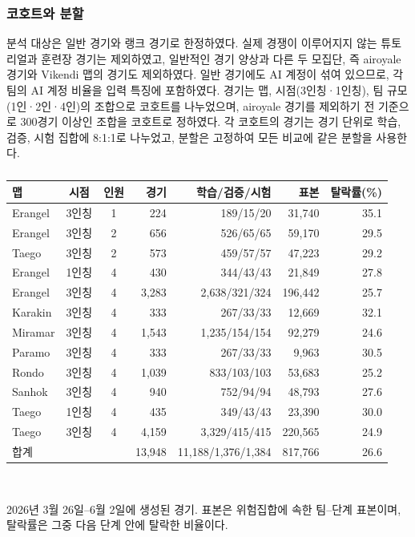 \subsubsection{코호트와 분할}
\label{sec:method:cohort}
분석 대상은 일반 경기와 랭크 경기로 한정하였다.
실제 경쟁이 이루어지지 않는 튜토리얼과 훈련장 경기는 제외하였고, 일반적인 경기 양상과 다른 두 모집단, 즉  airoyale 경기와  Vikendi 맵의 경기도 제외하였다.
일반 경기에도 AI 계정이 섞여 있으므로, 각 팀의 AI 계정 비율을 입력 특징에 포함하였다.
경기는 맵, 시점(3인칭·1인칭), 팀 규모(1인·2인·4인)의 조합으로 코호트를 나누었으며, airoyale 경기를 제외하기 전 기준으로 300경기 이상인 조합을 코호트로 정하였다.
각 코호트의 경기는 경기 단위로 학습, 검증, 시험 집합에 8:1:1로 나누었고, 분할은 고정하여 모든 비교에 같은 분할을 사용한다.

\begin{table}[t]
\centering
\caption{}
\label{tab:cohorts}
\footnotesize
\setlength{\tabcolsep}{3pt}
\begin{tabular}{lccrrrr}
\hline
맵 & 시점 & 인원 & 경기 & 학습/검증/시험 & 표본 & 탈락률(\%) \\
\hline
Erangel & 3인칭 & 1 & 224 & 189/15/20 & 31,740 & 35.1 \\
Erangel & 3인칭 & 2 & 656 & 526/65/65 & 59,170 & 29.5 \\
Taego & 3인칭 & 2 & 573 & 459/57/57 & 47,223 & 29.2 \\
Erangel & 1인칭 & 4 & 430 & 344/43/43 & 21,849 & 27.8 \\
Erangel & 3인칭 & 4 & 3,283 & 2,638/321/324 & 196,442 & 25.7 \\
Karakin & 3인칭 & 4 & 333 & 267/33/33 & 12,669 & 32.1 \\
Miramar & 3인칭 & 4 & 1,543 & 1,235/154/154 & 92,279 & 24.6 \\
Paramo & 3인칭 & 4 & 333 & 267/33/33 & 9,963 & 30.5 \\
Rondo & 3인칭 & 4 & 1,039 & 833/103/103 & 53,683 & 25.2 \\
Sanhok & 3인칭 & 4 & 940 & 752/94/94 & 48,793 & 27.6 \\
Taego & 1인칭 & 4 & 435 & 349/43/43 & 23,390 & 30.0 \\
Taego & 3인칭 & 4 & 4,159 & 3,329/415/415 & 220,565 & 24.9 \\
\hline
합계 & & & 13,948 & 11,188/1,376/1,384 & 817,766 & 26.6 \\
\hline
\end{tabular}
\\[2pt]
\parbox{\columnwidth}{\scriptsize 2026년 3월 26일--6월 2일에 생성된 경기. 표본은 위험집합에 속한 팀--단계 표본이며, 탈락률은 그중 다음 단계 안에 탈락한 비율이다.}
\end{table}

